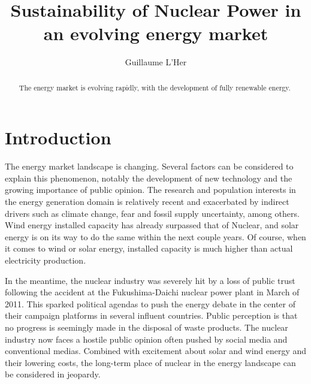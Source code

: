 \documentclass[IJPHM, 2017, 29]{PHMSociety}
\begin{document}
\renewcommand{\kbldelim}{[}%
\renewcommand{\kbrdelim}{]}%

\title{Sustainability of Nuclear Power in an evolving energy market}

\author{%
	Guillaume L'Her
}

\address{%
}

\maketitle
\pagestyle{fancy}
\thispagestyle{plain}



\begin{abstract}%
The energy market is evolving rapidly, with the development of fully renewable energy.
\end{abstract}



\section{Introduction}
\label{sec:intro}
The energy market landscape is changing. Several factors can be considered to explain this phenomenon, notably the development of new technology and the growing importance of public opinion. The research and population interests in the energy generation domain is relatively recent and exacerbated by indirect drivers such as climate change, fear and fossil supply uncertainty, among others. Wind energy installed capacity has already surpassed that of Nuclear, and solar energy is on its way to do the same within the next couple years. Of course, when it comes to wind or solar energy, installed capacity is much higher than actual electricity production.

In the meantime, the nuclear industry was severely hit by a loss of public trust following the accident at the Fukushima-Daichi nuclear power plant in March of 2011. This sparked political agendas to push the energy debate in the center of their campaign platforms in several influent countries. Public perception is that no progress is seemingly made in the disposal of waste products. The nuclear industry now faces a hostile public opinion often pushed by social media and conventional medias. Combined with excitement about solar and wind energy and their lowering costs, the long-term place of nuclear in the energy landscape can be considered in jeopardy.
\end{document}
